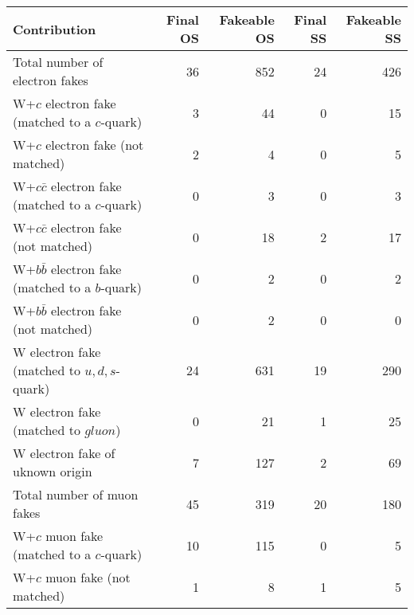 \begin{table}[!t]
\begin{center}
\begin{tabular}{|l|r|r|r|r|}
\hline
                                                                                        Contribution
& Final OS & Fakeable OS & Final SS & Fakeable SS \\
\hline
                                                                     Total number of electron fakes &         36 &        852 &         24 &        426 \\
\hline
                               W+$c$ electron fake (matched to a $c$-quark) &          3 &         44 &          0 &         15 \\
                                          W+$c$ electron fake (not matched) &          2 &          4 &          0 &          5 \\
                        W+$c\bar{c}$ electron fake (matched to a $c$-quark) &          0 &          3 &          0 &          3 \\
                                   W+$c\bar{c}$ electron fake (not matched) &          0 &         18 &          2 &         17 \\
                        W+$b\bar{b}$ electron fake (matched to a $b$-quark) &          0 &          2 &          0 &          2 \\
                                   W+$b\bar{b}$ electron fake (not matched) &          0 &          2 &          0 &          0 \\
                                 W electron fake (matched to $u,d,s$-quark) &         24 &        631 &         19 &        290 \\
                                       W electron fake (matched to $gluon$) &          0 &         21 &          1 &         25 \\
                                           W electron fake of uknown origin &          7 &        127 &          2 &         69 \\
\hline
\hline
                                                                      Total number of muon fakes &         45 &        319 &         20 &        180 \\
\hline
                                    W+$c$ muon fake (matched to a $c$-quark) &         10 &        115 &          0 &          5 \\
                                               W+$c$ muon fake (not matched) &          1 &          8 &          1 &          5 \\

\end{tabular}
\end{center}
\end{table}
